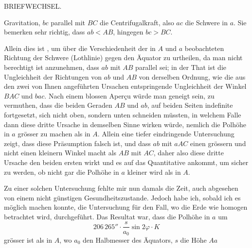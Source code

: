 \clearpage
{}\hfill BRIEFWECHSEL.\hfill\mbox{}\par
\noindent Gravitation, $bc$ parallel mit $BC$ die Centrifugalkraft, also $ac$ die Schwere in $a$. Sie bemerken sehr richtig, dass $ab<AB$, hingegen $bc>BC$.
\begin{center}
\end{center}
Allein dies ist , um über die Verschiedenheit der in $A$ und $a$ beobachteten Richtung der Schwere (Lothlinie) gegen den Äquator zu urtheilen, da man nicht berechtigt ist anzunehmen, dass $ab$ mit $AB$ parallel sei; in der That ist die Ungleichheit der Richtungen von $ab$ und $AB$ von derselben Ordnung, wie die aus den zwei von Ihnen angeführten Ursachen entspringende Ungleichheit der Winkel $BAC$ und $bac$. Nach einem blossen Aperçu würde man geneigt sein, zu vermuthen, dass die beiden Geraden $AB$ und $ab$, auf beiden Seiten indefinite fortgesetzt, sich nicht oben, sondern unten schneiden müssten, in welchem Falle dann diese dritte Ursache in demselben Sinne wirken würde, nemlich die Polhöhe in $a$ grösser zu machen als in $A$. Allein eine tiefer eindringende Untersuchung zeigt, dass diese Präsumption falsch ist, und dass $ab$ mit $aAC$ einen grössern und nicht einen kleinern Winkel macht als $AB$ mit $AC$, daher also diese dritte Ursache den beiden ersten  wirkt und es auf das Quantitative ankommt, um sicher zu werden, ob nicht gar die Polhöhe in $a$ kleiner wird als in $A$.

Zu einer solchen Untersuchung fehlte mir nun damals die Zeit, auch abgesehen von einem nicht günstigen Gesundheitszustande. Jedoch habe ich, sobald ich es möglich machen konnte, die Untersuchung für den Fall, wo die Erde wie homogen betrachtet wird, durchgeführt. Das Resultat war, dass die Polhöhe in $a$ um
\[
206\,265''\cdot\frac s{a_0}\sin2\varphi\cdot K
\]
grösser ist als in $A$, wo $a_0$ den Halbmesser des Äquators, $s$ die Höhe $Aa$

